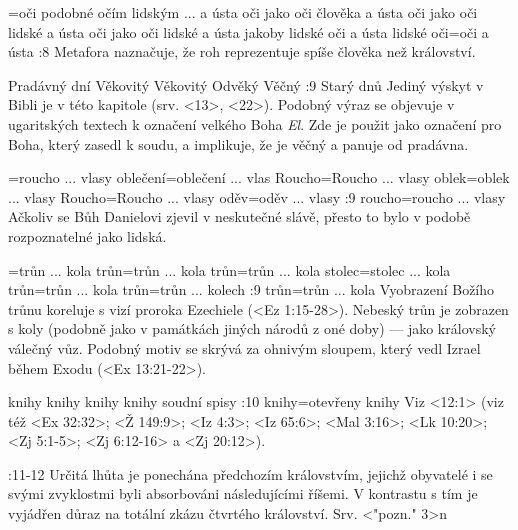 ={oči podobné očím lidským ... a ústa}   %
   {oči jako oči člověka a ústa}   %
   {oči jako oči lidské a ústa}   %
   {oči jako oči lidské a ústa}   %
   {jakoby lidské oči a ústa}   %
   {lidské oči}={oči a ústa}   %
:8 {}
     Metafora naznačuje, že roh reprezentuje spíše člověka než království. 
     
   {Pradávný dní}   %
   {Věkovitý}   %
   {Věkovitý}   %
   {Odvěký}   %
   {Věčný}   %
:9 {Starý dnů} Jediný výskyt v Bibli je v této kapitole (srv. <13>, <22>). Podobný výraz se objevuje v ugaritských textech k označení velkého Boha  {\em El}. Zde je použit jako označení pro Boha, který zasedl k soudu, a implikuje, že je věčný a  panuje od pradávna.

={roucho ... vlasy}   %
   {oblečení}={oblečení ... vlas}   %
   {Roucho}={Roucho ... vlasy}    %
   {oblek}={oblek ... vlasy}    %
   {Roucho}={Roucho ... vlasy}    %
   {oděv}={oděv ... vlasy}    %
:9 {roucho}={roucho ... vlasy} Ačkoliv se Bůh Danielovi zjevil v neskutečné slávě, přesto to bylo v podobě rozpoznatelné jako lidská.

={trůn ... kola} %
    {trůn}={trůn ... kola} %
     {trůn}={trůn ... kola}  %
     {stolec}={stolec ... kola} %
     {trůn}={trůn ... kola}  %
     {trůn}={trůn ... kolech}  %
:9 {trůn}={trůn ... kola} Vyobrazení Božího trůnu koreluje s vizí proroka Ezechiele (<Ez 1:15-28>).
      Nebeský trůn je zobrazen s koly (podobně jako v památkách jiných národů z oné doby) --- jako královský válečný vůz. Podobný motiv se skrývá za ohnivým sloupem, který vedl Izrael během Exodu (<Ex 13:21-22>).

    {knihy} %
    {knihy}  %
    {knihy} %
    {knihy}  %
    {soudní spisy}  %
:10 {knihy}={otevřeny knihy} Viz  <12:1> (viz též <Ex 32:32>; <Ž 149:9>; <Iz 4:3>; <Iz 65:6>;  <Mal 3:16>; <Lk 10:20>; <Zj 5:1-5>; <Zj 6:12-16> a <Zj 20:12>).

:11-12 {}  Určitá lhůta je ponechána předchozím královstvím, jejichž obyvatelé i se svými zvyklostmi byli absorbováni následujícími říšemi. V kontrastu s tím je vyjádřen důraz na totální zkázu čtvrtého království. Srv. <"pozn." 3>n

